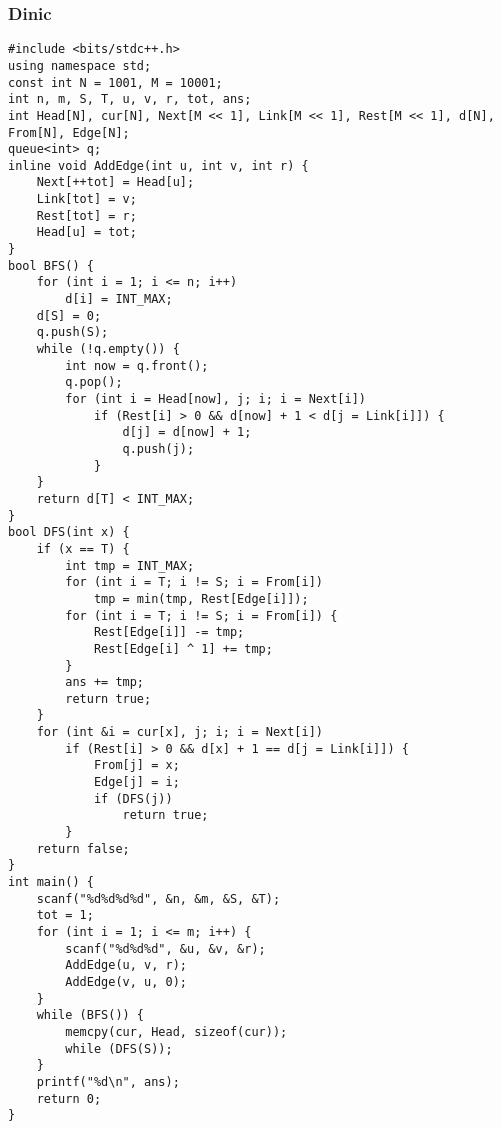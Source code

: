 ﻿\documentclass[a4paper]{article}
\begin{document}
\subsubsection{Dinic}
\begin{lstlisting}
#include <bits/stdc++.h>
using namespace std;
const int N = 1001, M = 10001;
int n, m, S, T, u, v, r, tot, ans;
int Head[N], cur[N], Next[M << 1], Link[M << 1], Rest[M << 1], d[N], From[N], Edge[N];
queue<int> q;
inline void AddEdge(int u, int v, int r) {
    Next[++tot] = Head[u];
    Link[tot] = v;
    Rest[tot] = r;
    Head[u] = tot;
}
bool BFS() {
    for (int i = 1; i <= n; i++)
        d[i] = INT_MAX;
    d[S] = 0;
    q.push(S);
    while (!q.empty()) {
        int now = q.front();
        q.pop();
        for (int i = Head[now], j; i; i = Next[i])
            if (Rest[i] > 0 && d[now] + 1 < d[j = Link[i]]) {
                d[j] = d[now] + 1;
                q.push(j);
            }
    }
    return d[T] < INT_MAX;
}
bool DFS(int x) {
    if (x == T) {
        int tmp = INT_MAX;
        for (int i = T; i != S; i = From[i])
            tmp = min(tmp, Rest[Edge[i]]);
        for (int i = T; i != S; i = From[i]) {
            Rest[Edge[i]] -= tmp;
            Rest[Edge[i] ^ 1] += tmp;
        }
        ans += tmp;
        return true;
    }
    for (int &i = cur[x], j; i; i = Next[i])
        if (Rest[i] > 0 && d[x] + 1 == d[j = Link[i]]) {
            From[j] = x;
            Edge[j] = i;
            if (DFS(j))
                return true;
        }
    return false;
}
int main() {
    scanf("%d%d%d%d", &n, &m, &S, &T);
    tot = 1;
    for (int i = 1; i <= m; i++) {
        scanf("%d%d%d", &u, &v, &r);
        AddEdge(u, v, r);
        AddEdge(v, u, 0);
    }
    while (BFS()) {
        memcpy(cur, Head, sizeof(cur));
        while (DFS(S));
    }
    printf("%d\n", ans);
    return 0;
}
\end{lstlisting}
\end{document}
